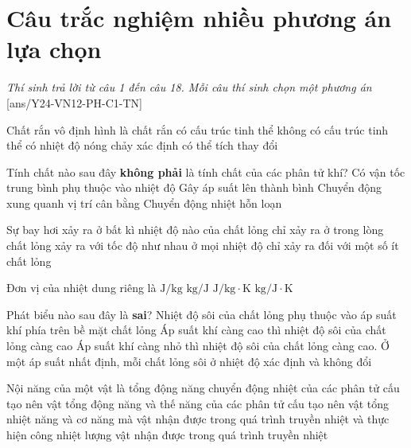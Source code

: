 \section{Câu trắc nghiệm nhiều phương án lựa chọn}
\textit{Thí sinh trả lời từ câu 1 đến câu 18. Mỗi câu thí sinh chọn một phương án}
\setcounter{ex}{0}
[ans/Y24-VN12-PH-C1-TN]
\begin{ex}
	Chất rắn vô định hình là chất rắn
	\choice
	{có cấu trúc tinh thể}
	{\True không có cấu trúc tinh thể}
	{có nhiệt độ nóng chảy xác định}
	{có thể tích thay đổi}
	\loigiai{}
\end{ex}
\begin{ex}
	Tính chất nào sau đây \textbf{không phải} là tính chất của các phân tử khí?
	\choice
	{Có vận tốc trung bình phụ thuộc vào nhiệt độ}
	{Gây áp suất lên thành bình}
	{\True Chuyển động xung quanh vị trí cân bằng}
	{Chuyển động nhiệt hỗn loạn}
	\loigiai{}
\end{ex}
\begin{ex}
	Sự bay hơi
	\choice
	{\True xảy ra ở bất kì nhiệt độ nào của chất lỏng}
	{chỉ xảy ra ở trong lòng chất lỏng}
	{xảy ra với tốc độ như nhau ở mọi nhiệt độ}
	{chỉ xảy ra đối với một số ít chất lỏng}
	\loigiai{}
\end{ex}
\begin{ex}
	Đơn vị của nhiệt dung riêng là
		\choice
	{$\si{\joule/\kilogram}$}
	{$\si{\kilogram/\joule}$}
	{\True $\si{\joule/\kilogram\cdot\kelvin}$}
	{$\si{\kilogram/\joule\cdot\kelvin}$}
	\loigiai{}
\end{ex}
\begin{ex}
	Phát biểu nào sau đây là \textbf{sai}?
	\choice
	{Nhiệt độ sôi của chất lỏng phụ thuộc vào áp suất khí phía trên bề mặt chất lỏng}
	{Áp suất khí càng cao thì nhiệt độ sôi của chất lỏng càng cao}
	{\True Áp suất khí càng nhỏ thì nhiệt độ sôi của chất lỏng càng cao.}
	{Ở một áp suất nhất định, mỗi chất lỏng sôi ở nhiệt độ xác định và không đổi}
	\loigiai{}
\end{ex}
\begin{ex}
Nội năng của một vật là	
	\choice
	{tổng động năng chuyển động nhiệt của các phân tử cấu tạo nên vật}
	{\True tổng động năng và thế năng của các phân tử cấu tạo nên vật}
	{tổng nhiệt năng và cơ năng mà vật nhận được trong quá trình truyền nhiệt và thực hiện công}
	{nhiệt lượng vật nhận được trong quá trình truyền nhiệt}
	\loigiai{}
\end{ex}
